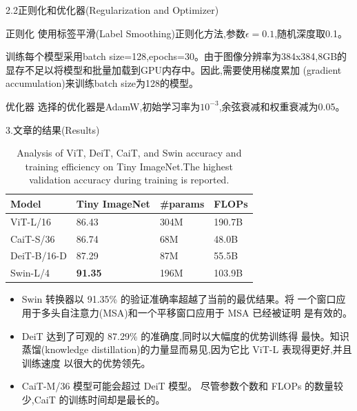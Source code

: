 \documentclass[UTF8]{ctexbeamer}
\begin{document}
\begin{frame}{2.2正则化和优化器(Regularization and Optimizer)}
  \begin{block}{正则化}
    使用标签平滑(Label Smoothing)正则化方法,参数$\epsilon = 0.1$,随机深度取0.1。

    训练每个模型采用batch size=128,epochs=30。由于图像分辨率为384x384,8GB的
    显存不足以将模型和批量加载到GPU内存中。因此,需要使用梯度累加
    (gradient accumulation)来训练batch size为128的模型。
  \end{block}
  \begin{block}{优化器}
    选择的优化器是AdamW,初始学习率为$10^{-3}$,余弦衰减和权重衰减为0.05。
  \end{block}
\end{frame}

\begin{frame}{3.文章的结果(Results)}
  \begin{table}[h]
    \centering
    \begin{tabular}{|l|l|l|l|}
    \hline
    Model & Tiny ImageNet & \#params & FLOPs \\
    \hline
    ViT-L/16 & 86.43 & 304M & 190.7B \\
    CaiT-S/36 & 86.74 & 68M & 48.0B \\
    DeiT-B/16-D & 87.29 & 87M & 55.5B \\
    Swin-L/4 & \textbf{91.35} & 196M & 103.9B \\
    \hline
    \end{tabular}
    \caption{Analysis of ViT, DeiT, CaiT, and Swin accuracy and training
     efficiency on Tiny ImageNet.The highest validation accuracy during training is reported.}
    \end{table}
    \begin{itemize}
      \item Swin 转换器以 91.35\% 的验证准确率超越了当前的最优结果。将
      一个窗口应用于多头自注意力(MSA)和一个平移窗口应用于 MSA 已经被证明
      是有效的。
      \item DeiT 达到了可观的 87.29\% 的准确度,同时以大幅度的优势训练得
      最快。知识蒸馏(knowledge distillation)的力量显而易见,因为它比 ViT-L 表现得更好,并且训练速度
      以很大的优势领先。
      \item CaiT-M/36 模型可能会超过 DeiT 模型。
      尽管参数个数和 FLOPs 的数量较少,CaiT 的训练时间却是最长的。
    \end{itemize}
\end{frame}
\end{document}
